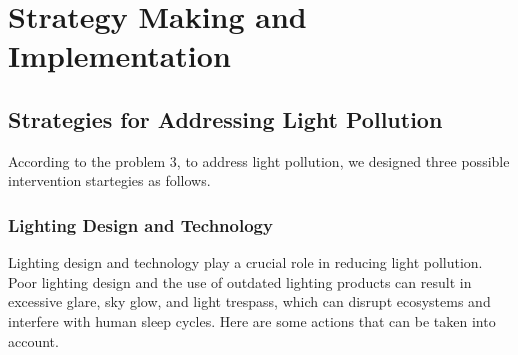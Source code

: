 \MinParskip{}

\section{Strategy Making and Implementation}

\subsection{Strategies for Addressing Light Pollution}

According to the problem 3, to address light pollution, we designed three possible intervention startegies as follows.

\subsubsection{Lighting Design and Technology}

Lighting design and technology play a crucial role in reducing light pollution. Poor lighting design and the use of outdated lighting products can result in excessive glare, sky glow, and light trespass, which can disrupt ecosystems and interfere with human sleep cycles. Here are some actions that can be taken into account.

